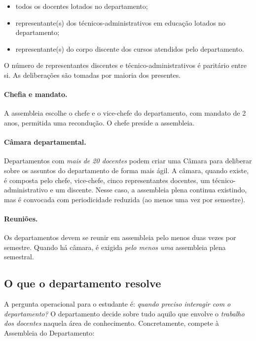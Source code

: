 \documentclass[10pt,a4paper]{extarticle}
\newcommand{\impt}[1]{\textcolor{important}{#1}}
\begin{document}
\begin{itemize}
    \item \impt{todos os docentes} lotados no departamento;
    \item representante(s) dos \impt{técnicos-administrativos em educação} lotados no departamento;
    \item representante(s) do \impt{corpo discente} dos cursos atendidos pelo departamento.
\end{itemize}

O número de representantes discentes e técnico-administrativos é paritário entre si. As deliberações são tomadas por maioria dos presentes.

\paragraph{Chefia e mandato.} A assembleia escolhe o \impt{chefe} e o \impt{vice-chefe} do departamento, com mandato de \impt{2 anos}, permitida uma recondução. O chefe preside a assembleia.

\paragraph{Câmara departamental.} Departamentos com \emph{mais de 20 docentes} podem criar uma \impt{Câmara} para deliberar sobre os assuntos do departamento de forma mais ágil. A câmara, quando existe, é composta pelo chefe, vice-chefe, cinco representantes docentes, um técnico-administrativo e um discente. Nesse caso, a assembleia plena continua existindo, mas é convocada com periodicidade reduzida (ao menos uma vez por semestre).

\paragraph{Reuniões.} Os departamentos devem se reunir em assembleia \impt{pelo menos duas vezes por semestre}. Quando há câmara, é exigida \emph{pelo menos uma} assembleia plena semestral.

\subsection{O que o departamento resolve}

A pergunta operacional para o estudante é: \emph{quando preciso interagir com o departamento?} O departamento decide sobre tudo aquilo que envolve o \emph{trabalho dos docentes} naquela área de conhecimento. Concretamente, compete à Assembleia do Departamento:
\end{document}
